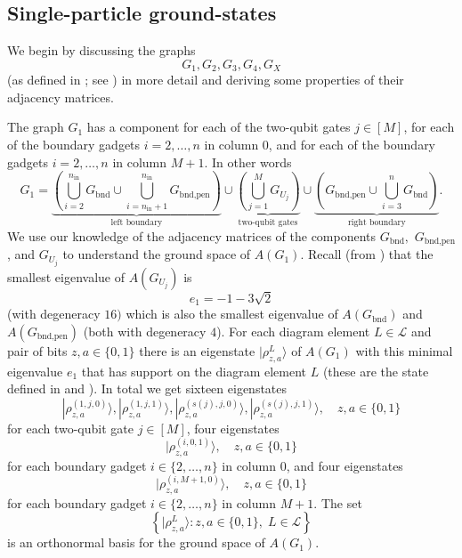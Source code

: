 \documentclass[../thesis-main/thesis-main]{subfiles}
\begin{document}
\subsection{Single-particle ground-states}\label{sec:adj_mat_g_graphs}

We begin by discussing the graphs
\begin{equation}
G_{1},G_{2},G_{3},G_{4},G_X
\end{equation}
(as defined in ; see ) in more detail and deriving some properties of their adjacency matrices.

The graph $G_{1}$ has a component for each of the two-qubit gates $j \in [M]$, for each of the boundary gadgets $i=2,\ldots,n$ in column $0$, and for each of the boundary gadgets $i=2,\ldots,n$ in column $M+1$. In other words 
\begin{equation}
  G_{1}=\underbrace{\left(\bigcup_{i=2}^{n_{\text{in}}}G_{\text{bnd}}\cup \bigcup_{i=n_{\text{in}}+1}^{n_{\text{in}}}G_{\text{bnd,pen}}\right)}_{\text{left boundary}}\cup\underbrace{\left(\bigcup_{j=1}^{M}G_{U_j}\right)}_{\text{two-qubit gates}}\cup\underbrace{\left(G_{\text{bnd,pen}}\cup \bigcup_{i=3}^{n}G_{\text{bnd}}\right)}_{\text{right boundary}}.\label{eq:G_alpha}
\end{equation}
We use our knowledge of the adjacency matrices of the components $G_\text{bnd},$ $G_{\text{bnd,pen}}$, and $G_{U_j}$ to understand the ground space of $A(G_1)$.  Recall (from ) that the smallest eigenvalue of $A(G_{U_j})$ is 
\begin{equation}
  e_{1}=-1-3\sqrt{2}
\end{equation}
(with degeneracy $16)$ which is also the smallest eigenvalue of $A(G_{\text{bnd}})$ and $A(G_{\text{bnd,pen}})$ (both with degeneracy $4$).  For each diagram element $L\in\mathcal{L}$ and pair of bits $z,a\in\{0,1\}$ there is an eigenstate $|\rho_{z,a}^{L}\rangle$ of $A(G_{1})$ with this minimal eigenvalue $e_{1}$ that has support on the diagram element $L$ (these are the state defined in  and ).  In total we get sixteen eigenstates
\begin{equation}
  |\rho_{z,a}^{(1,j,0)}\rangle,|\rho_{z,a}^{(1,j,1)}\rangle,|\rho_{z,a}^{(s(j),j,0)}\rangle,|\rho_{z,a}^{(s(j),j,1)}\rangle,\quad z,a\in\{0,1\}
\end{equation}
for each two-qubit gate $j\in[M]$, four eigenstates 
\begin{equation}
  |\rho_{z,a}^{(i,0,1)}\rangle,\quad z,a\in\{0,1\}
\end{equation}
for each boundary gadget $i\in\{2,\ldots,n\}$ in column $0$, and four eigenstates 
\begin{equation}
  |\rho_{z,a}^{(i,M+1,0)}\rangle,\quad z,a\in\{0,1\}
\end{equation}
for each boundary gadget $i\in\{2,\ldots,n\}$ in column $M+1$. The set 
\begin{equation}
  \left\{ |\rho_{z,a}^{L}\rangle\colon z,a\in\{0,1\},\; L\in\mathcal{L}\right\} 
\end{equation}
is an orthonormal basis for the ground space of $A(G_{1})$. 
\end{document}

